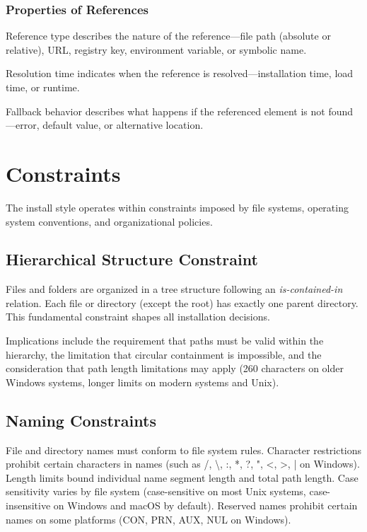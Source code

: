 \documentclass[11pt]{article}
\begin{document}
\subsubsection{Properties of References}

Reference type describes the nature of the reference---file path (absolute or relative), URL, registry key, environment variable, or symbolic name.

Resolution time indicates when the reference is resolved---installation time, load time, or runtime.

Fallback behavior describes what happens if the referenced element is not found---error, default value, or alternative location.

\section{Constraints}

The install style operates within constraints imposed by file systems, operating system conventions, and organizational policies.

\subsection{Hierarchical Structure Constraint}

Files and folders are organized in a tree structure following an \textit{is-contained-in} relation. Each file or directory (except the root) has exactly one parent directory. This fundamental constraint shapes all installation decisions.

Implications include the requirement that paths must be valid within the hierarchy, the limitation that circular containment is impossible, and the consideration that path length limitations may apply (260 characters on older Windows systems, longer limits on modern systems and Unix).

\subsection{Naming Constraints}

File and directory names must conform to file system rules. Character restrictions prohibit certain characters in names (such as /, \textbackslash, :, *, ?, ", <, >, | on Windows). Length limits bound individual name segment length and total path length. Case sensitivity varies by file system (case-sensitive on most Unix systems, case-insensitive on Windows and macOS by default). Reserved names prohibit certain names on some platforms (CON, PRN, AUX, NUL on Windows).
\end{document}

